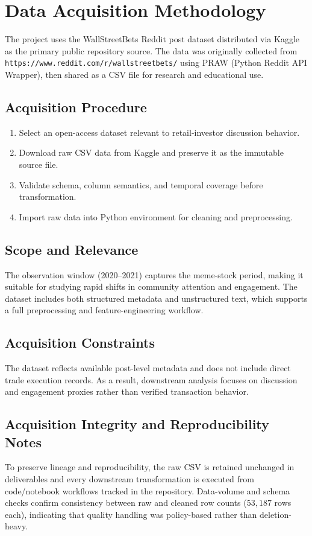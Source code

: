 \section{Data Acquisition Methodology}

The project uses the WallStreetBets Reddit post dataset distributed via Kaggle as the primary public repository source. The data was originally collected from \texttt{https://www.reddit.com/r/wallstreetbets/} using PRAW (Python Reddit API Wrapper), then shared as a CSV file for research and educational use.

\subsection{Acquisition Procedure}
\begin{enumerate}
  \item Select an open-access dataset relevant to retail-investor discussion behavior.
  \item Download raw CSV data from Kaggle and preserve it as the immutable source file.
  \item Validate schema, column semantics, and temporal coverage before transformation.
  \item Import raw data into Python environment for cleaning and preprocessing.
\end{enumerate}

\subsection{Scope and Relevance}
The observation window (2020--2021) captures the meme-stock period, making it suitable for studying rapid shifts in community attention and engagement. The dataset includes both structured metadata and unstructured text, which supports a full preprocessing and feature-engineering workflow.

\subsection{Acquisition Constraints}
The dataset reflects available post-level metadata and does not include direct trade execution records. As a result, downstream analysis focuses on discussion and engagement proxies rather than verified transaction behavior.

\subsection{Acquisition Integrity and Reproducibility Notes}
To preserve lineage and reproducibility, the raw CSV is retained unchanged in deliverables and every downstream transformation is executed from code/notebook workflows tracked in the repository. Data-volume and schema checks confirm consistency between raw and cleaned row counts (\(53{,}187\) rows each), indicating that quality handling was policy-based rather than deletion-heavy.


